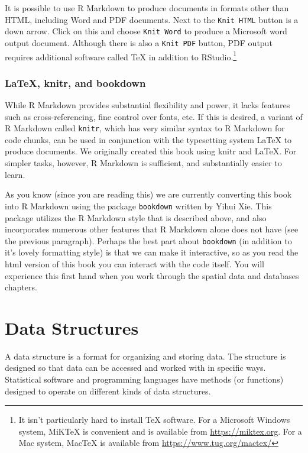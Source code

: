 \documentclass[]{krantz}
\begin{document}
It is possible to use R Markdown to produce documents in formats other than HTML, including Word and PDF documents. Next to the \texttt{Knit\ HTML} button is a down arrow. Click on this and choose \texttt{Knit\ Word} to produce a Microsoft word output document. Although there is also a \texttt{Knit\ PDF} button, PDF output requires additional software called TeX in addition to RStudio.\footnote{It isn't particularly hard to install TeX software. For a Microsoft Windows system, MiKTeX is convenient and is available from \url{https://miktex.org}. For a Mac system, MacTeX is available from \url{https://www.tug.org/mactex/}}

\hypertarget{latex-knitr-and-bookdown}{%
\subsection{LaTeX, knitr, and bookdown}\label{latex-knitr-and-bookdown}}

While R Markdown provides substantial flexibility and power, it lacks features such as cross-referencing, fine control over fonts, etc. If this is desired, a variant of R Markdown called \texttt{knitr}, which has very similar syntax to R Markdown for code chunks, can be used in conjunction with the typesetting system LaTeX to produce documents. We originally created this book using knitr and LaTeX. For simpler tasks, however, R Markdown is sufficient, and substantially easier to learn.

As you know (since you are reading this) we are currently converting this book into R Markdown using the package \texttt{bookdown} written by Yihui Xie. This package utilizes the R Markdown style that is described above, and also incorporates numerous other features that R Markdown alone does not have (see the previous paragraph). Perhaps the best part about \texttt{bookdown} (in addition to it's lovely formatting style) is that we can make it interactive, so as you read the html version of this book you can interact with the code itself. You will experience this first hand when you work through the spatial data and databases chapters.

\hypertarget{data-structures}{%
\chapter{Data Structures}\label{data-structures}}

A data structure is a format for organizing and storing data. The structure is designed so that data can be accessed and worked with in specific ways. Statistical software and programming languages have methods (or functions) designed to operate on different kinds of data structures.
\end{document}

